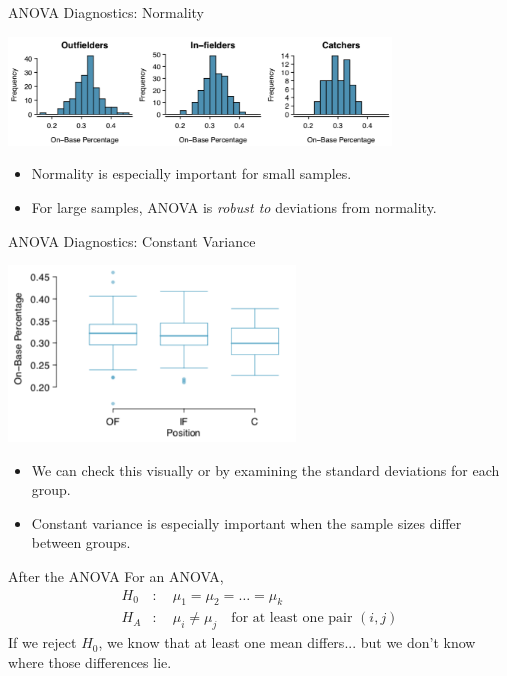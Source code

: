 \begin{frame}{ANOVA Diagnostics: Normality}
    \begin{center}
        \includegraphics[width=4in]{images/obphists.png}
    \end{center}
    \begin{itemize}
        \item Normality is especially important for small samples.
        \item For large samples, ANOVA is \textit{robust to} deviations from normality.
    \end{itemize}
\end{frame}

\begin{frame}{ANOVA Diagnostics: Constant Variance}
    \begin{center}
        \includegraphics[width=3in]{images/mlb.png}
    \end{center}
    \vspace{-12pt}\begin{itemize}
        \item We can check this visually or by examining the standard deviations for each group.
        \item Constant variance is especially important when the sample sizes differ between groups.
    \end{itemize}
\end{frame}

\begin{frame}{After the ANOVA}
    For an ANOVA,
    \begin{align*}
        H_0&: \quad \mu_1 = \mu_2 = \dots = \mu_k \\
        H_A&: \quad \mu_i \ne \mu_j \quad \text{for at least one pair } (i,j) 
    \end{align*}
    If we reject $H_0$, we know that at least one mean differs... but we don't know where those differences lie.
\end{frame}

